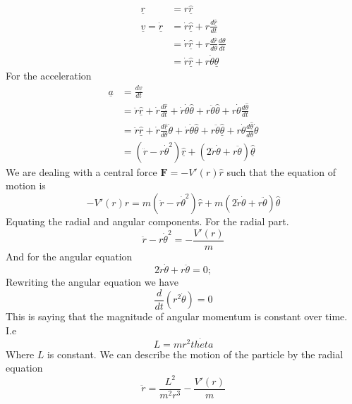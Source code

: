 \begin{example}
\begin{align*}
  \underline{r} &= r \underline{ \hat{r}}\\
  \underline{v} = \underline{ \dot{r}} &= \dot{r} \underline{ \hat{r}}
  + r \frac{d \underline{ \hat{r}}}{dt}\\
  &= \dot{r} \underline{ \hat{r}} + r \frac{d \hat{r}}{d\theta}
  \frac{d\theta}{dt}\\
  &= \dot{r} \underline{ \hat{r}} + r \dot{\theta} \underline{ \hat{ \theta}}
\end{align*}
For the acceleration
\begin{align*}
  \underline{a} &= \frac{d \underline{v}}{dt}\\
  &= \ddot{r} \underline{ \hat{r}} + \dot{r} \frac{d \underline{ \hat{r}}}{dt}
  + \dot{r} \dot{\theta} \hat{\theta} + r \ddot{\theta} \hat{\theta}
  + r \dot{\theta} \frac{d \hat{\theta}}{dt}\\
  &= \ddot{r} \underline{ \hat{r}} + \dot{r} \frac{d \underline{
  \hat{r}}}{d\theta} \dot{\theta} + \dot{r} \dot{\theta} \hat{\theta}
  + r \ddot{\theta} \underline{ \hat{\theta}} + r \dot{\theta} \frac{d
  \underline{ \hat{\theta}}}{d\theta} \dot{\theta}\\
  &= ( \ddot{r} - r \dot{\theta}^2) \underline{ \hat{r}} + (2 \dot{r}
  \dot{\theta} + r \ddot{\theta}) \underline{\hat{\theta}}  
\end{align*}
We are dealing with a central force \( \textbf{F} = -V'(r) \hat{r} \) such that
the equation of motion is
\[ 
  -V'(r) \hat{r} = m( \ddot{r} - r \dot{ \theta}^2) \hat{r} + m(2 \dot{r}
  \dot{\theta} + r \ddot{\theta}) \hat{\theta}
\]
Equating the radial and angular components. For the radial part.
\[ 
  \ddot{r} - r \dot{\theta}^2 = - \frac{V'(r)}{m}
\]
And for the angular equation
\[ 
  2 \dot{r} \dot{\theta} + r \ddot{\theta} = 0;
\]
Rewriting the angular equation we have
\[ 
  \frac{d}{dt}(r^2 \dot{\theta}) = 0
\]
This is saying that the magnitude of angular momentum is constant over time.
I.e 
\[ 
  L = mr^2 \dot{theta}
\]
Where \( L \) is constant. We can describe the motion of the particle by the
radial equation
\[ 
  \ddot{r} = \frac{L^2}{m^2r^3} - \frac{V'(r)}{m}
\]
\end{example}
